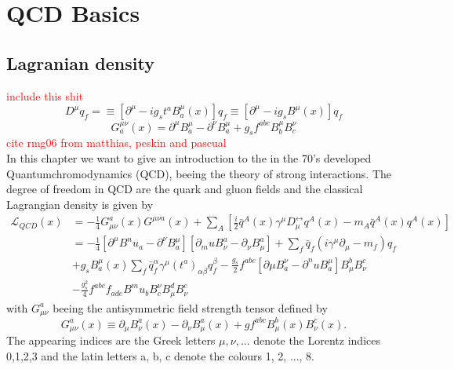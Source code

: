 \chapter{QCD Basics}
	\section{Lagranian density}
	\textcolor{red}{include this shit}
	\begin{equation}	
		D^\mu q_f = \equiv [ \partial^\mu-ig_st^aB^\mu_a(x) ]q_f \equiv [\partial^\mu-ig_sB^\mu(x)]q_f
	\end{equation}
	\begin{equation}
		G^{\mu\nu}_a(x) = \partial^\mu B^\mu_a-\partial^\nu B^\mu_a+g_sf^{abc}B^\mu_bB^\nu_c
	\end{equation}
	\textcolor{red}{cite rmg06 from matthias, peskin and pascual} \\
	In this chapter we want to give an introduction to the in the 70's developed Quantumchromodynamics (QCD), beeing the theory of strong interactions. The degree of freedom in QCD are the quark and gluon fields and the classical Lagrangian density is given by
	\begin{equation}
		\label{eq:QCDLagrangian}
		\begin{split}	
			\mathcal{L}_{QCD}(x) &= -\frac{1}{4} G_{\mu\nu}^a(x) G^{\mu\nu a}(x) + \sum_A \left[ \frac{i}{2} \bar q^A(x) \gamma^\mu D_\mu^\leftrightarrow q^A(x) - m_A \bar q^A(x) q^A(x)\right] \\
			&= -\frac{1}{4}[\partial^\mu B^nu_a-\partial^\nu B^\mu_a][\partial_mu B^a_\nu - \partial_\nu B^a_\mu] + \sum_f \bar q_f (i\gamma^\mu \partial_\mu -m_f)q_f \\
			& +g_s B^\mu_a(x)\sum_f\bar q^\alpha_f \gamma^\mu (t^a)_{\alpha\beta} q^\beta_f -\frac{g_s}{2}f^{abc}[\partial\mu B^\nu_a - \partial^nu B^\mu_a]B^b_\mu B^c_\nu \\
			& - \frac{g^2_s}{4}f^{abc}f_{ade} B^mu_b B^\nu_c B^d_\mu B^e_\nu 
		\end{split}
	\end{equation}
	with $G_{\mu\nu}^a$ beeing the antisymmetric field strength tensor defined by
	\begin{equation}
		G_{\mu\nu}^a(x) \equiv \partial_\mu B_\nu^a(x) - \partial_\nu B_\mu^a (x) + g f^{abc} B_\mu^b(x) B_\nu^c(x).
	\end{equation}
	The appearing indices are the Greek letters $\mu, \nu, ...$ denote the Lorentz indices 0,1,2,3 and the latin letters a, b, c denote the colours 1, 2, ..., 8. \\
